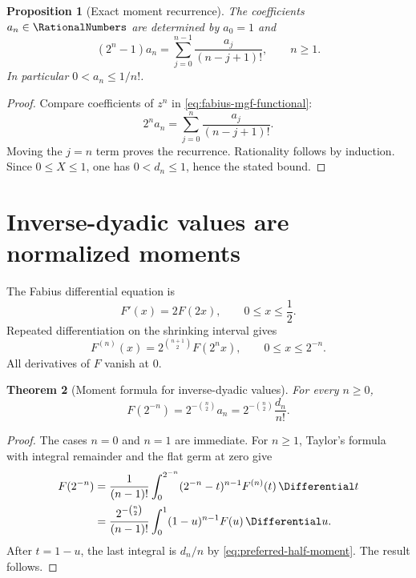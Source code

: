 \documentclass[11pt,oneside]{book}
\numberwithin{equation}{chapter}
\newtheorem{theorem}{Theorem}[chapter]
\newtheorem{proposition}[theorem]{Proposition}
\theoremstyle{definition}
\theoremstyle{remark}
\begin{document}
\begin{proposition}[Exact moment recurrence]
\label{prop:fabius-moment-recurrence}
The coefficients $a_n\in\RationalNumbers$ are determined by $a_0=1$ and
\begin{equation}
 \boxed{
 (2^n-1)a_n=\sum_{j=0}^{n-1}\frac{a_j}{(n-j+1)!},
 \qquad n\ge1.}
 \label{eq:fabius-a-recurrence}
\end{equation}
In particular $0<a_n\le1/n!$.
\end{proposition}

\begin{proof}
Compare coefficients of $z^n$ in \eqref{eq:fabius-mgf-functional}:
\[
 2^na_n=\sum_{j=0}^{n}\frac{a_j}{(n-j+1)!}.
\]
Moving the $j=n$ term proves the recurrence.  Rationality follows by
induction.  Since $0\le X\le1$, one has $0<d_n\le1$, hence the stated bound.
\end{proof}

\section{Inverse-dyadic values are normalized moments}

The Fabius differential equation is
\begin{equation}
 F'(x)=2F(2x),
 \qquad 0\le x\le\frac12.
 \label{eq:fabius-differential}
\end{equation}
Repeated differentiation on the shrinking interval gives
\begin{equation}
 F^{(n)}(x)=2^{\binom{n+1}{2}}F(2^nx),
 \qquad 0\le x\le2^{-n}.
 \label{eq:fabius-repeated-derivative}
\end{equation}
All derivatives of $F$ vanish at $0$.

\begin{theorem}[Moment formula for inverse-dyadic values]
\label{thm:fabius-inverse-dyadic}
For every $n\ge0$,
\begin{equation}
 \boxed{
 F(2^{-n})=2^{-\binom n2}a_n
          =2^{-\binom n2}\frac{d_n}{n!}.}
 \label{eq:fabius-inverse-dyadic}
\end{equation}
\end{theorem}

\begin{proof}
The cases $n=0$ and $n=1$ are immediate.  For $n\ge1$, Taylor's formula
with integral remainder and the flat germ at zero give
\begin{align*}
 F(2^{-n})
 &=\frac1{(n-1)!}\int_0^{2^{-n}}
   (2^{-n}-t)^{n-1}F^{(n)}(t)\,\Differential t\\
 &=\frac{2^{-\binom n2}}{(n-1)!}
   \int_0^1(1-u)^{n-1}F(u)\,\Differential u.
\end{align*}
After $t=1-u$, the last integral is $d_n/n$ by
\eqref{eq:preferred-half-moment}.  The result follows.
\end{proof}
\end{document}
